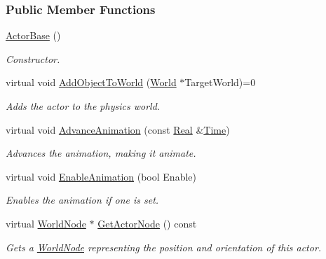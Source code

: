 \subsubsection*{Public Member Functions}
\begin{DoxyCompactItemize}
\item 
\hyperlink{classphys_1_1ActorBase_ab44709e6a5e2ce7b77862978cb1eafb4}{ActorBase} ()
\begin{DoxyCompactList}\small\item\em Constructor. \item\end{DoxyCompactList}\item 
virtual void \hyperlink{classphys_1_1ActorBase_a3d28e4c4a33f50210101695cb33ded3b}{AddObjectToWorld} (\hyperlink{classphys_1_1World}{World} $\ast$TargetWorld)=0
\begin{DoxyCompactList}\small\item\em Adds the actor to the physics world. \item\end{DoxyCompactList}\item 
virtual void \hyperlink{classphys_1_1ActorBase_aeab3b1111780577a9dc59893ff880fbf}{AdvanceAnimation} (const \hyperlink{namespacephys_af7eb897198d265b8e868f45240230d5f}{Real} \&\hyperlink{structphys_1_1Time}{Time})
\begin{DoxyCompactList}\small\item\em Advances the animation, making it animate. \item\end{DoxyCompactList}\item 
virtual void \hyperlink{classphys_1_1ActorBase_a72203a9c7befd1ab606ff69af4183849}{EnableAnimation} (bool Enable)
\begin{DoxyCompactList}\small\item\em Enables the animation if one is set. \item\end{DoxyCompactList}\item 
virtual \hyperlink{classphys_1_1WorldNode}{WorldNode} $\ast$ \hyperlink{classphys_1_1ActorBase_a1718f316f4e20eb97654a2d77581588a}{GetActorNode} () const 
\begin{DoxyCompactList}\small\item\em Gets a \hyperlink{classphys_1_1WorldNode}{WorldNode} representing the position and orientation of this actor. \item\end{DoxyCompactList}\item 

\end{DoxyCompactItemize}
